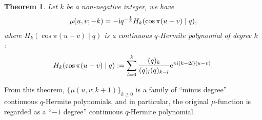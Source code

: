 \documentclass[pdftex]{sigma}
\numberwithin{equation}{section}
\newtheorem{thm}{Theorem}[section]
\theoremstyle{definition}
\begin{document}
\begin{thm}\label{thm:mu and CqH}
Let $k$ be a non-negative integer, we have
\begin{gather*}%
\mu(u,v;-k)
 =
 -{\rm i}q^{-\frac{1}{8}}H_{k}(\cos{\pi (u-v)}\mid q),
\end{gather*}
where $H_{k}(\cos{\pi (u-v)}\mid q)$ is a continuous $q$-Hermite polynomial of degree $k$ {\rm \cite[p.~543]{KLS}}:
\[
H_{k}(\cos{\pi (u-v)} \mid q)
 :=
 \sum_{l=0}^{k}
 \frac{(q)_{k}}{(q)_{l}(q)_{k-l}}
 {\rm e}^{\pi{\rm i}(k-2l)(u-v)}.
\]
\end{thm}
From this theorem, $\{\mu(u,v;k+1)\}_{k\geq 0}$ is a family of ``minus degree'' continuous $q$-Hermite polynomials, and in particular, the original $\mu$-function is regarded as a ``$-1$ degree'' continuous $q$-Hermite polynomial.
\end{document}
